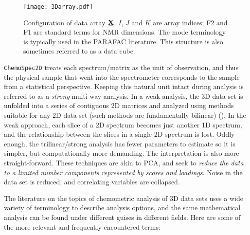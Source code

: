 \documentclass[letter,10pt,twocolumn,twoside,printwatermark=false]{pinp}
\begin{document}
\begin{figure}
\begin{center}
  \texttt{[image: 3Darray.pdf]}
  \caption{\label{3Darray}Configuration of data array $\stackunder[1.2pt]{$\mathbf{X}$}{\rule{1.2ex}{.075ex}}$. $I$, $J$ and $K$ are array indices; F2 and F1 are standard terms for NMR dimensions. The mode terminology is typically used in the PARAFAC literature.  This structure is also sometimes referred to as a data cube.}
\end{center}
\end{figure}

\texttt{ChemoSpec2D} treats each spectrum/matrix as the unit of
observation, and thus the physical sample that went into the
spectrometer corresponds to the sample from a statistical perspective.
Keeping this natural unit intact during analysis is referred to as a
\emph{strong} multi-way analysis. In a weak analysis, the 3D data set is
unfolded into a series of contiguous 2D matrices and analyzed using
methods suitable for any 2D data set (such methods are fundamentally
bilinear) (\cite{Huang2003}). In the weak approach, each slice of a 2D
spectrum becomes just another 1D spectrum, and the relationship between
the slices in a single 2D spectrum is lost. Oddly enough, the
trilinear/strong analysis has fewer parameters to estimate so it is
simpler, but computationally more demanding. The interpretation is also
more straight-forward. These techniques are akin to PCA, and seek to
\emph{reduce the data to a limited number components represented by
scores and loadings}. Noise in the data set is reduced, and correlating
variables are collapsed.

The literature on the topics of chemometric analysis of 3D data sets
uses a wide variety of terminology to describe analysis options, and the
same mathematical analysis can be found under different guises in
different fields. Here are some of the more relevant and frequently
encountered terms:
\end{document}
